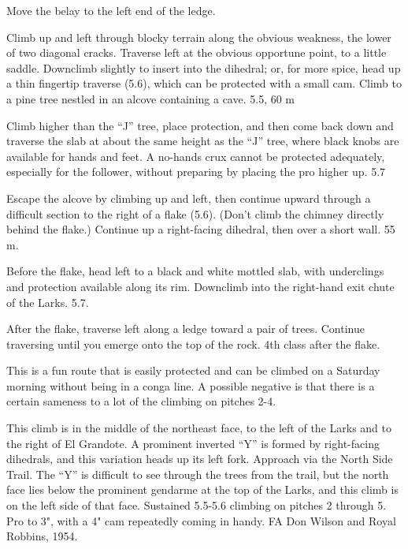 \documentclass{tahquitz}
\begin{document}
 Move the belay to the left end of the ledge.


 Climb up and left through blocky terrain along the obvious weakness, the
lower of two diagonal cracks. Traverse left at the obvious opportune point, to a
little saddle. Downclimb slightly to insert into the dihedral; or, for more spice,
head up a thin fingertip traverse (5.6),
which can be protected with a small cam.
Climb to a pine tree nestled in an alcove containing a cave. 5.5, 60 m

 Climb higher than the ``J'' tree, place protection, and then come
back down and traverse the slab at about the same height as the ``J'' tree, where black
knobs are available for hands and feet. A no-hands crux cannot be protected adequately,
especially for the follower, without preparing by placing the pro higher up. 5.7

 Escape the alcove by climbing up and left, then continue
upward through a difficult section to the right of a flake (5.6).
(Don't climb the chimney directly behind the flake.) Continue up a
right-facing dihedral, then over a short wall.
55 m. 

 Before the flake, head left to a black and white mottled slab, with underclings
and protection available along its rim. Downclimb into the right-hand exit chute of the Larks. 5.7.

 After the flake, traverse left along a ledge toward a pair of trees. Continue
traversing until you emerge onto the top of the rock. 4th class after the flake.

\somespace

\northgully




This is a fun route that is easily protected and
can be climbed on a Saturday morning without being in a conga line. A
possible negative is that there is a certain sameness to a lot of the
climbing on pitches 2-4.

This climb is in the middle of the northeast face, to the left of the
Larks and to the right of El Grandote. A prominent inverted ``Y'' is
formed by right-facing dihedrals, and this variation heads up its
left fork. Approach via the North Side Trail. The ``Y'' is difficult to
see through the trees from the trail, but the north face lies below
the prominent gendarme at the top of the Larks, and this climb is on
the left side of that face. Sustained 5.5-5.6 climbing on pitches 2
through 5. Pro to 3", with  a 4" cam repeatedly coming in handy.
FA Don Wilson and Royal Robbins, 1954.
\end{document}
